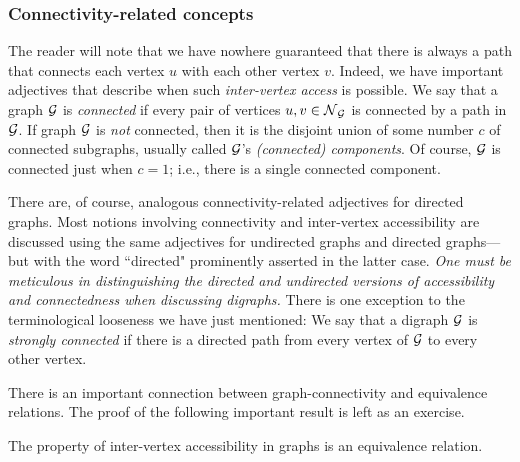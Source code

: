 \medskip


\subsubsection{Connectivity-related concepts}
\label{sec:connectivity-notions}

The reader will note that we have nowhere guaranteed that there is always a path that connects each vertex $u$ with each other vertex $v$.  Indeed, we have important adjectives that describe when such {\em inter-vertex access} is possible.  We say that a graph $\mbox{$\cal G$}$ is {\it connected} if every pair of vertices $u, v \in \mbox{$\cal N$}_{\mbox{{\scriptsize $\cal G$}}}$ is connected by a path in $\mbox{$\cal G$}$.  If graph $\mbox{$\cal G$}$ is {\em not} connected, then it is the disjoint union of some number $c$ of connected subgraphs, usually called $\mbox{$\cal G$}$'s {\it (connected) components}.  Of course, $\mbox{$\cal G$}$ is connected just when $c=1$; i.e., 
there is a single connected component.

There are, of course, analogous connectivity-related adjectives for directed graphs.  Most notions involving connectivity and inter-vertex accessibility are discussed using the same adjectives for undirected graphs and directed graphs---but with the word ``directed" prominently asserted in the latter case.  {\em One must be meticulous in distinguishing the directed and undirected versions of accessibility and connectedness when discussing digraphs.}  There is one exception to the terminological looseness we have just mentioned:  We say that a digraph $\mbox{$\cal G$}$ is {\it strongly connected} if there is a directed path from every vertex of $\mbox{$\cal G$}$ to every
other vertex.

\medskip

There is an important connection between graph-connectivity and equivalence relations.  The proof of the following important result is left as an exercise.

\begin{prop}
\label{thm:Accessibility-Equivalence}
The property of inter-vertex accessibility in graphs is an equivalence relation.
\end{prop}



